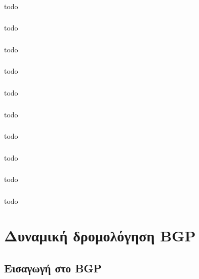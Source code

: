 \documentclass[a4paper, 12pt]{article}
\begin{document}
		\subsubsection{}
			todo

		\subsubsection{}
			todo

		\subsubsection{}
			todo

		\subsubsection{}
			todo

		\subsubsection{}
			todo

		\subsubsection{}
			todo

		\subsubsection{}
			todo

		\subsubsection{}
			todo

		\subsubsection{}
			todo

		\subsubsection{}
			todo

\section{Δυναμική δρομολόγηση BGP}

	\subsection{Εισαγωγή στο BGP}
\end{document}
